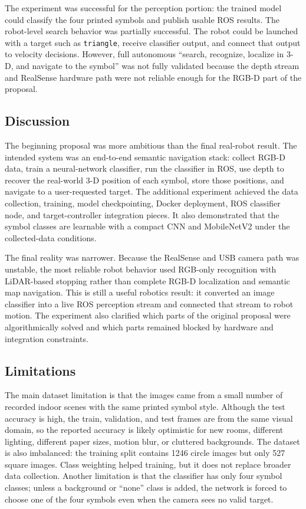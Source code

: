 \documentclass[letterpaper, 10 pt, conference]{ieeeconf/ieeeconf}
\begin{document}
The experiment was successful for the perception portion: the trained model
could classify the four printed symbols and publish usable ROS results.
The robot-level search behavior was partially successful.
The robot could be launched with a target such as \texttt{triangle}, receive
classifier output, and connect that output to velocity decisions.
However, full autonomous ``search, recognize, localize in 3-D, and navigate to
the symbol'' was not fully validated because the depth stream and RealSense
hardware path were not reliable enough for the RGB-D part of the proposal.

\subsection{Discussion}

The beginning proposal was more ambitious than the final real-robot result.
The intended system was an end-to-end semantic navigation stack: collect RGB-D
data, train a neural-network classifier, run the classifier in ROS, use depth
to recover the real-world 3-D position of each symbol, store those positions,
and navigate to a user-requested target.
The additional experiment achieved the data collection, training, model
checkpointing, Docker deployment, ROS classifier node, and target-controller
integration pieces.
It also demonstrated that the symbol classes are learnable with a compact CNN
and MobileNetV2 under the collected-data conditions.

The final reality was narrower.
Because the RealSense and USB camera path was unstable, the most reliable
robot behavior used RGB-only recognition with LiDAR-based stopping rather than
complete RGB-D localization and semantic map navigation.
This is still a useful robotics result: it converted an image classifier into
a live ROS perception stream and connected that stream to robot motion.
The experiment also clarified which parts of the original proposal were
algorithmically solved and which parts remained blocked by hardware and
integration constraints.

\subsection{Limitations}

The main dataset limitation is that the images came from a small number of
recorded indoor scenes with the same printed symbol style.
Although the test accuracy is high, the train, validation, and test frames are
from the same visual domain, so the reported accuracy is likely optimistic for
new rooms, different lighting, different paper sizes, motion blur, or cluttered
backgrounds.
The dataset is also imbalanced: the training split contains 1246 circle images
but only 527 square images.
Class weighting helped training, but it does not replace broader data
collection.
Another limitation is that the classifier has only four symbol classes; unless
a background or ``none'' class is added, the network is forced to choose one of
the four symbols even when the camera sees no valid target.
\end{document}
